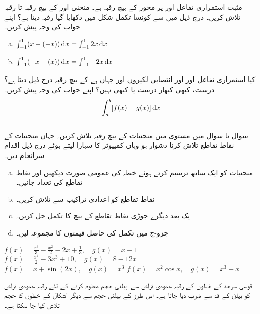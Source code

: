 %
مثبت استمراری تفاعل  اور  پر  محور کے بیچ رقبہ  ہے۔ منحنی  اور  کے بیچ رقبہ   تا  رقبہ تلاش کریں۔
درج ذیل میں سے کونسا تکمل شکل  میں دکھایا گیا رقبہ دیتا ہے؟ اپنے جواب کی وجہ پیش کریں۔
\begin{enumerate}[a.]
\item
$\int_{-1}^1(x-(-x))\dif x=\int_{-1}^12x\dif x$
\item
$\int_{-1}^1(-x-(x))\dif x=\int_{-1}^1-2x\dif x$
\end{enumerate}
کیا استمراری تفاعل  اور  اور انتصابی لکیروں  اور  جہاں  ہے کے بیچ رقبہ درج ذیل دیتا ہے؟ درست، کبھی کبھار درست یا کبھی نہیں؟ اپنے جواب کی وجہ پیش کریں۔
\begin{align*}
\int_a^b[f(x)-g(x)]\dif x
\end{align*}
\\
سوال  تا سوال  میں مستوی میں منحنیات کے بیچ رقبہ تلاش کریں۔ جہاں منحنیات کے نقاط تقاطع تلاش کرنا دشوار ہو وہاں کمپیوٹر کا سہارا لیتے ہوئے درج ذیل اقدام سرانجام دیں۔
\begin{enumerate}[a.]
\item
منحنیات کو ایک ساتھ ترسیم کرتے ہوئے خطہ کی عمومی صورت دیکھیں اور نقاط تقاطع کی تعداد جانیں۔
\item
نقاط تقاطع کو اعدادی تراکیب سے تلاش کریں۔
\item
یک بعد دیگرے جوڑی نقاط تقاطع کے بیچ  کا تکمل حل کریں۔
\item
جزو-ج میں تکمل کی حاصل قیمتوں کا مجموعہ لیں۔
\end{enumerate}

$f(x)=\tfrac{x^3}{3}-\tfrac{x^2}{2}-2x+\tfrac{1}{3},\quad g(x)=x-1$
$f(x)=\tfrac{x^4}{2}-3x^3+10,\quad g(x)=8-12x$
$f(x)=x+\sin(2x),\quad g(x)=x^3$
$f(x)=x^2\cos x,\quad g(x)=x^3-x$

قوسی سرحد کے خطوں کے رقبہ عمودی تراش سے بیلنی حجم معلوم کرنے کے لئے رقبہ عمودی تراش کو بیلن کے قد سے ضرب دیا جاتا ہے۔ اس طرز کے بیلنی حجم سے دیگر اشکال کے خطوں کا حجم تلاش کیا جا سکتا ہے۔

